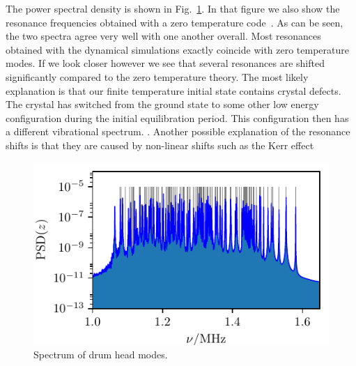 \documentclass[aps, pra, preprint]{revtex4-1}
\begin{document}
The power spectral density is shown in
Fig.~\ref{fig:axial_spectrum}. In that figure we also show the
resonance frequencies obtained with a zero temperature
code~. As can be seen, the two
spectra agree very well with one another overall. Most resonances
obtained with the dynamical simulations exactly coincide with
zero temperature modes. If we look closer however we see that
several resonances are shifted significantly compared to the zero
temperature theory. The most likely explanation is that our
finite temperature initial state contains crystal defects. The
crystal has switched from the ground state to some other low
energy configuration during the initial equilibration period.
This configuration then has a different vibrational spectrum.
. Another possible
explanation of the resonance shifts is that they are caused by
non-linear shifts such as the Kerr effect 

\begin{figure}
  \includegraphics{./figures/fig_axial_spectrum.pdf}
  \caption{Spectrum of drum head modes.}
  \label{fig:axial_spectrum}
\end{figure}
\end{document}
